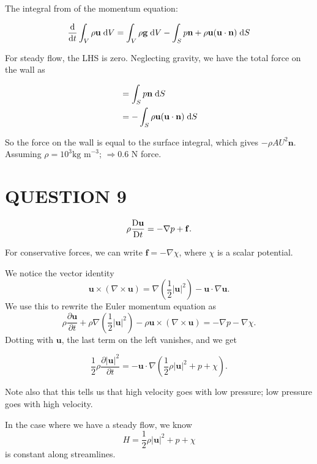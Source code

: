 \documentclass[a4paper]{article}
\begin{document}
The integral from of the momentum equation:

\[ \frac{\mathrm{d} }{\mathrm{d} t}  \int_{V}  \rho \mathbf{u} \; \mathrm{d} V = \int_{V} \rho \mathbf{g} \; \mathrm{d} V - \int_{S} p \mathbf{n} + \rho \mathbf{u} (\mathbf{u} \cdot \mathbf{n}) \; \mathrm{d} S \]

For steady flow, the LHS is zero. Neglecting gravity, we have the total force on the wall as 

\begin{align*}
& = \int_{S} p \mathbf{n} \; \mathrm{d} S \\
& = - \int_{S} \rho \mathbf{u} (\mathbf{u} \cdot \mathbf{n}) \; \mathrm{d} S 
\end{align*}

So the force on the wall is equal to the surface integral, which gives $ - \rho A U^{2} \mathbf{n} $. Assuming $ \rho = 10^{3} \text{kg m}^{-3} $; $ \Rightarrow 0.6 $ N force. 



\section{QUESTION 9}

\begin{prop}
	\[
	\rho \frac{\mathrm{D} \mathbf{u}}{\mathrm{D} t} = - \nabla p + \mathbf{f}.
	\]
\end{prop}

For conservative forces, we can write $\mathbf{f} = -\nabla \chi$, where $\chi$ is a scalar potential.

We notice the vector identity
\[
\mathbf{u}\times (\nabla \times \mathbf{u}) = \nabla\left(\frac{1}{2}|\mathbf{u}|^2\right) - \mathbf{u}\cdot \nabla \mathbf{u}.
\]
We use this to rewrite the Euler momentum equation as
\[
\rho \frac{\partial \mathbf{u}}{\partial t} + \rho \nabla \left(\frac{1}{2}|\mathbf{u}|^2\right) - \rho \mathbf{u}\times (\nabla \times \mathbf{u}) = -\nabla p - \nabla \chi.
\]
Dotting with $\mathbf{u}$, the last term on the left vanishes, and we get
\begin{prop}
	\[
	\frac{1}{2}\rho \frac{\partial|\mathbf{u}|^2}{\partial t} = -\mathbf{u}\cdot \nabla \left(\frac{1}{2} \rho |\mathbf{u}|^2 + p + \chi\right).
	\]
\end{prop}
Note also that this tells us that high velocity goes with low pressure; low pressure goes with high velocity.

In the case where we have a steady flow, we know
\[
H = \frac{1}{2}\rho |\mathbf{u}|^2 + p + \chi
\]
is constant along streamlines.
\end{document}
